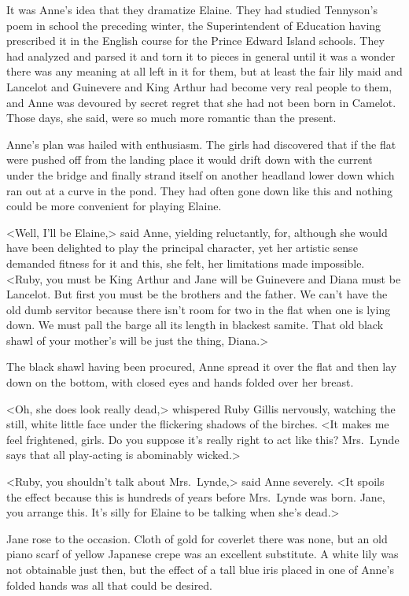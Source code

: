 It was Anne's idea that they dramatize Elaine. They had studied Tennyson's poem in school the preceding winter, the Superintendent of Education having prescribed it in the English course for the Prince Edward Island schools. They had analyzed and parsed it and torn it to pieces in general until it was a wonder there was any meaning at all left in it for them, but at least the fair lily maid and Lancelot and Guinevere and King Arthur had become very real people to them, and Anne was devoured by secret regret that she had not been born in Camelot. Those days, she said, were so much more romantic than the present.

Anne's plan was hailed with enthusiasm. The girls had discovered that if the flat were pushed off from the landing place it would drift down with the current under the bridge and finally strand itself on another headland lower down which ran out at a curve in the pond. They had often gone down like this and nothing could be more convenient for playing Elaine.

<Well, I'll be Elaine,> said Anne, yielding reluctantly, for, although she would have been delighted to play the principal character, yet her artistic sense demanded fitness for it and this, she felt, her limitations made impossible. <Ruby, you must be King Arthur and Jane will be Guinevere and Diana must be Lancelot. But first you must be the brothers and the father. We can't have the old dumb servitor because there isn't room for two in the flat when one is lying down. We must pall the barge all its length in blackest samite. That old black shawl of your mother's will be just the thing, Diana.>

The black shawl having been procured, Anne spread it over the flat and then lay down on the bottom, with closed eyes and hands folded over her breast.

<Oh, she does look really dead,> whispered Ruby Gillis nervously, watching the still, white little face under the flickering shadows of the birches. <It makes me feel frightened, girls. Do you suppose it's really right to act like this? Mrs.~Lynde says that all play-acting is abominably wicked.>

<Ruby, you shouldn't talk about Mrs.~Lynde,> said Anne severely. <It spoils the effect because this is hundreds of years before Mrs.~Lynde was born. Jane, you arrange this. It's silly for Elaine to be talking when she's dead.>

Jane rose to the occasion. Cloth of gold for coverlet there was none, but an old piano scarf of yellow Japanese crepe was an excellent substitute. A white lily was not obtainable just then, but the effect of a tall blue iris placed in one of Anne's folded hands was all that could be desired.

